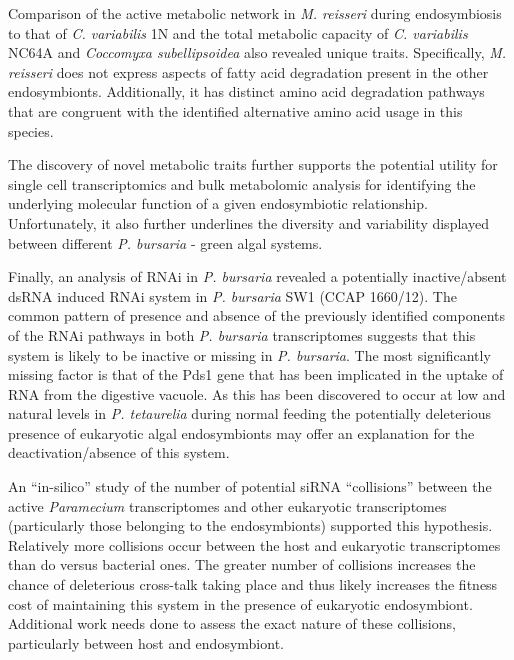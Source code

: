 Comparison of the active metabolic network in \textit{M. reisseri}
during endosymbiosis to that of \textit{C. variabilis} 1N 
and the total metabolic capacity of \textit{C. variabilis} NC64A
and \textit{Coccomyxa subellipsoidea} also revealed 
unique traits.  Specifically, \textit{M. reisseri} does not express
aspects of fatty acid degradation present in the other endosymbionts.
Additionally, it has distinct amino acid degradation pathways that are
congruent with the identified alternative amino acid usage in this species. 

The discovery of novel metabolic traits further supports the potential
 utility for single cell transcriptomics and bulk metabolomic
 analysis for identifying the underlying molecular function
 of a given endosymbiotic relationship.
 Unfortunately, it also further underlines the diversity
 and variability displayed between different \textit{P. bursaria}
 - green algal systems.  


 Finally, an analysis of RNAi in \textit{P. bursaria}
 revealed a potentially inactive/absent dsRNA induced RNAi system
 in \textit{P. bursaria} SW1 (CCAP 1660/12).  
 The common pattern of presence and absence of the
 previously identified components of the 
 RNAi pathways in both \textit{P. bursaria} transcriptomes
suggests that this system is likely to be inactive or missing in 
\textit{P. bursaria}. The most significantly missing factor is that
of the Pds1 gene that has been implicated in the uptake of RNA
from the digestive vacuole. As this has been discovered to occur
at low and natural levels in \textit{P. tetaurelia} during normal
feeding \citep{Carradec2015} the potentially deleterious 
presence of eukaryotic algal endosymbionts
may offer an explanation for the deactivation/absence of this system.

An ``in-silico'' study of the number of potential siRNA ``collisions''
between the active \textit{Paramecium} transcriptomes and other
eukaryotic transcriptomes (particularly those belonging to the endosymbionts) 
supported this hypothesis.  Relatively more collisions occur between
the host and eukaryotic transcriptomes than do versus bacterial ones.
The greater number of collisions increases the chance of deleterious
cross-talk taking place and thus likely increases the fitness
cost of maintaining this system in the presence of eukaryotic endosymbiont. 
Additional work needs done to assess the exact nature of these collisions,
particularly between host and endosymbiont. 




